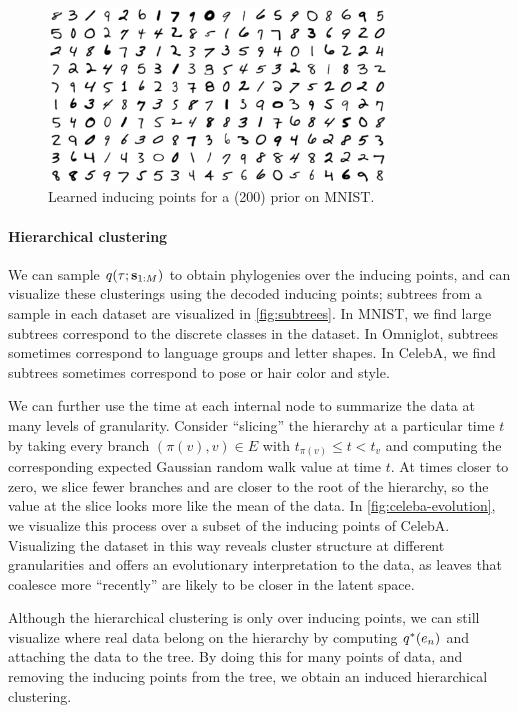 \begin{figure}[t]
\centering
\includegraphics[width=0.8\textwidth]{img/loracs/mnist/mnist-inducing-points.png}
\caption{Learned inducing points for a \acronym(200) prior on MNIST.}
\label{fig:mnist-inducing}
\end{figure}

\paragraph{Hierarchical clustering}
We can sample
$q(\tau ; \mathbf{s}_{1:M})$ to obtain
phylogenies
over the inducing points,
and can visualize these clusterings
using the decoded inducing points;
subtrees from a sample in each dataset
are visualized in \autoref{fig:subtrees}.
In MNIST, we find large subtrees
correspond to the discrete classes
in the dataset. In Omniglot,
subtrees sometimes correspond to language groups
and letter shapes. In CelebA,
we find subtrees sometimes correspond
to pose or hair color and style.

We can further use the time at each internal node
to summarize the data at many levels of granularity.
Consider ``slicing'' the hierarchy
at a particular time $t$ by
taking every branch $(\pi(v), v) \in E$ with $t_{\pi(v)} \leq t < t_v$
and computing the corresponding expected Gaussian random walk value at time $t$.
At times closer to zero, we slice
fewer branches and are closer to the root
of the hierarchy, so the value at the slice
looks more like the mean of the data.
In \autoref{fig:celeba-evolution}, 
we visualize this process over a subset
of the inducing points of CelebA.
Visualizing the dataset in this way
reveals cluster structure at 
different granularities
and offers an evolutionary interpretation
to the data, as leaves that coalesce 
more ``recently'' are likely to be closer in 
the latent space.

Although the hierarchical clustering is only
over inducing points, we can still visualize
where real data belong on the hierarchy
by computing $q^*(e_n)$ and
attaching the data to the tree.
By doing this for many points of data, and removing
the inducing points from the tree,
we obtain an induced hierarchical clustering.

